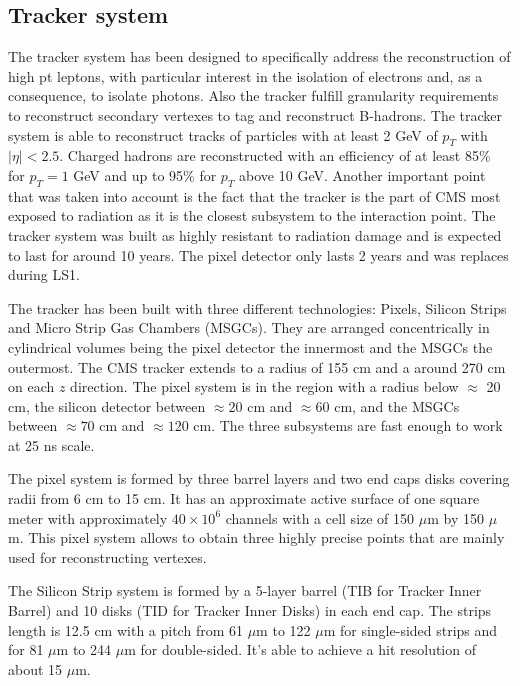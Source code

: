 \subsection{Tracker system}
\label{sec:tracker}

The tracker system has been designed to specifically address the reconstruction of high pt leptons, with particular interest in the isolation of electrons and, as a consequence, to isolate photons. Also the tracker fulfill granularity requirements to reconstruct secondary vertexes to tag and reconstruct B-hadrons. The tracker system is able to reconstruct tracks of particles with at least 2 GeV of $p_{T}$ with $|\eta|<2.5$. Charged hadrons are reconstructed with an efficiency of at least 85\% for $p_{T}=1$ GeV and up to 95\% for $p_{T}$ above 10 GeV. Another important point that was taken into account is the fact that the tracker is the part of CMS most exposed to radiation as it is the closest subsystem to the interaction point. The tracker system was built as highly resistant to radiation damage and is expected to last for around 10 years. The pixel detector only lasts 2 years and was replaces during LS1. 

The tracker has been built with three different technologies: Pixels, Silicon Strips and Micro Strip Gas Chambers (MSGCs). They are arranged concentrically in cylindrical volumes being the pixel detector the innermost and the MSGCs the outermost. The CMS tracker extends to a radius of 155 cm and a around 270 cm on each $z$ direction. The pixel system is in the region with a radius below $\approx$ 20 cm, the silicon detector between $\approx 20$ cm and $\approx 60$ cm, and the MSGCs between $\approx 70$ cm and $\approx 120$ cm. The three subsystems are fast enough to work at 25 ns scale.

The pixel system is formed by three barrel layers and two end caps disks covering radii from 6 cm to 15 cm. It has an approximate active surface of one square meter with approximately $40\times10^{6}$ channels with a cell size of 150 $\mu$m by 150 $\mu$m. This pixel system allows to obtain three highly precise points that are mainly used for reconstructing vertexes.

The Silicon Strip system is formed by a 5-layer barrel (TIB for Tracker Inner Barrel) and 10 disks (TID for Tracker Inner Disks) in each end cap. The strips length is 12.5 cm with a pitch from 61 $\mu$m to 122 $\mu$m for single-sided strips and for 81 $\mu$m to 244 $\mu$m for double-sided. It's able to achieve a hit resolution of about 15 $\mu$m. 

